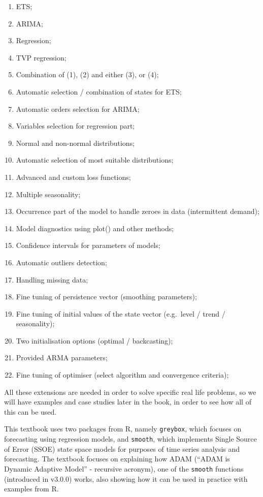 \documentclass[
]{book}
\providecommand{\tightlist}{%
  \setlength{\itemsep}{0pt}\setlength{\parskip}{0pt}}
\theoremstyle{definition}
\theoremstyle{definition}
\theoremstyle{definition}
\theoremstyle{definition}
\theoremstyle{remark}
\begin{document}
\begin{enumerate}
\def\labelenumi{\arabic{enumi}.}
\tightlist
\item
  ETS;
\item
  ARIMA;
\item
  Regression;
\item
  TVP regression;
\item
  Combination of (1), (2) and either (3), or (4);
\item
  Automatic selection / combination of states for ETS;
\item
  Automatic orders selection for ARIMA;
\item
  Variables selection for regression part;
\item
  Normal and non-normal distributions;
\item
  Automatic selection of most suitable distributions;
\item
  Advanced and custom loss functions;
\item
  Multiple seasonality;
\item
  Occurrence part of the model to handle zeroes in data (intermittent demand);
\item
  Model diagnostics using plot() and other methods;
\item
  Confidence intervals for parameters of models;
\item
  Automatic outliers detection;
\item
  Handling missing data;
\item
  Fine tuning of persistence vector (smoothing parameters);
\item
  Fine tuning of initial values of the state vector (e.g.~level / trend / seasonality);
\item
  Two initialisation options (optimal / backcasting);
\item
  Provided ARMA parameters;
\item
  Fine tuning of optimiser (select algorithm and convergence criteria);
\end{enumerate}

All these extensions are needed in order to solve specific real life problems, so we will have examples and case studies later in the book, in order to see how all of this can be used.

This textbook uses two packages from R, namely \texttt{greybox}, which focuses on forecasting using regression models, and \texttt{smooth}, which implements Single Source of Error (SSOE) state space models for purposes of time series analysis and forecasting. The textbook focuses on explaining how ADAM (``ADAM is Dynamic Adaptive Model'' - recursive acronym), one of the \texttt{smooth} functions (introduced in v3.0.0) works, also showing how it can be used in practice with examples from R.
\end{document}
